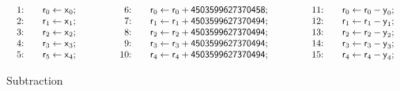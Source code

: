 \begin{figure}[ht]
  \centering
  \[
  \begin{array}{lclcl}
    \begin{array}{rcl}
    \textmd{1:} && \dslcode{r}_0 \leftarrow \dslcode{x}_0; \\
    \textmd{2:} && \dslcode{r}_1 \leftarrow \dslcode{x}_1; \\
    \textmd{3:} && \dslcode{r}_2 \leftarrow \dslcode{x}_2; \\
    \textmd{4:} && \dslcode{r}_3 \leftarrow \dslcode{x}_3; \\
    \textmd{5:} && \dslcode{r}_5 \leftarrow \dslcode{x}_4; \\
    \end{array}
    &\hspace{.05\textwidth}&
    \begin{array}{rcl}
    \textmd{6:} && 
      \dslcode{r}_0 \leftarrow \dslcode{r}_0 + \dslcode{4503599627370458}; \\
    \textmd{7:} &&
      \dslcode{r}_1 \leftarrow \dslcode{r}_1 + \dslcode{4503599627370494}; \\
    \textmd{8:} &&
      \dslcode{r}_2 \leftarrow \dslcode{r}_2 + \dslcode{4503599627370494}; \\
    \textmd{9:} &&
      \dslcode{r}_3 \leftarrow \dslcode{r}_3 + \dslcode{4503599627370494}; \\
    \textmd{10:} && 
      \dslcode{r}_4 \leftarrow \dslcode{r}_4 + \dslcode{4503599627370494};\\
    \end{array}
    &\hspace{.05\textwidth}&
    \begin{array}{rcl}
    \textmd{11:} && \dslcode{r}_0 \leftarrow \dslcode{r}_0 - \dslcode{y}_0; \\
    \textmd{12:} && \dslcode{r}_1 \leftarrow \dslcode{r}_1 - \dslcode{y}_1; \\
    \textmd{13:} && \dslcode{r}_2 \leftarrow \dslcode{r}_2 - \dslcode{y}_2; \\
    \textmd{14:} && \dslcode{r}_3 \leftarrow \dslcode{r}_3 - \dslcode{y}_3; \\
    \textmd{15:} && \dslcode{r}_4 \leftarrow \dslcode{r}_4 - \dslcode{y}_4;
    \end{array}
  \end{array}
  \]
  \caption{Subtraction }
  \label{figure:dsl:subtraction}
\end{figure}

